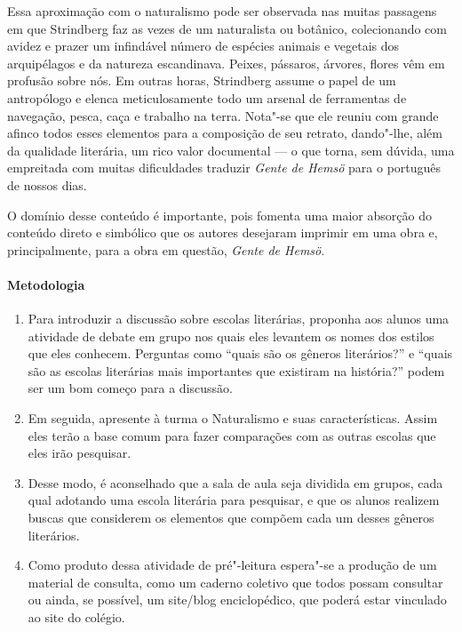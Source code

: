 \documentclass[12pt]{extarticle}
\begin{document}
Essa aproximação com o naturalismo pode ser observada nas muitas passagens em que
Strindberg faz as vezes de um naturalista ou botânico, colecionando com
avidez e prazer um infindável número de espécies animais e vegetais dos
arquipélagos e da natureza escandinava. Peixes, pássaros, árvores,
flores vêm em profusão sobre nós. Em outras horas, Strindberg assume o 
papel de um antropólogo e elenca meticulosamente todo um arsenal de
ferramentas de navegação, pesca, caça e trabalho na terra. Nota"-se que
ele reuniu com grande afinco todos esses elementos para a composição de
seu retrato, dando"-lhe, além da qualidade literária, um rico valor documental --- 
o que torna, sem dúvida, uma empreitada com muitas dificuldades traduzir 
\textit{Gente de Hemsö} para o português de nossos dias.

O domínio desse conteúdo é importante, pois fomenta uma maior absorção do conteúdo 
direto e simbólico que os autores desejaram imprimir em uma obra e, principalmente, 
para a obra em questão, \textit{Gente de Hemsö}.

\paragraph{Metodologia}

\begin{enumerate}

\item
Para introduzir a discussão sobre escolas literárias, proponha aos alunos
uma atividade de debate em grupo nos quais eles levantem os nomes dos 
estilos que eles conhecem. Perguntas como ``quais são os gêneros literários?'' 
e ``quais são as escolas literárias mais importantes que existiram na história?'' 
podem ser um bom começo para a discussão.

\item
Em seguida, apresente à turma o Naturalismo e suas características. Assim eles 
terão a base comum para fazer comparações com as outras escolas que eles irão pesquisar. 

\item
Desse modo, é aconselhado que a sala de aula seja dividida em grupos, cada qual adotando 
uma escola literária para pesquisar, e que os alunos realizem buscas que considerem os 
elementos que compõem cada um desses gêneros literários. 

\item
Como produto dessa atividade de pré"-leitura espera"-se a produção de um
material de consulta, como um caderno coletivo que todos possam consultar ou ainda, se 
possível, um site/blog enciclopédico, que poderá estar vinculado ao site do colégio.


\end{enumerate}
\end{document}
